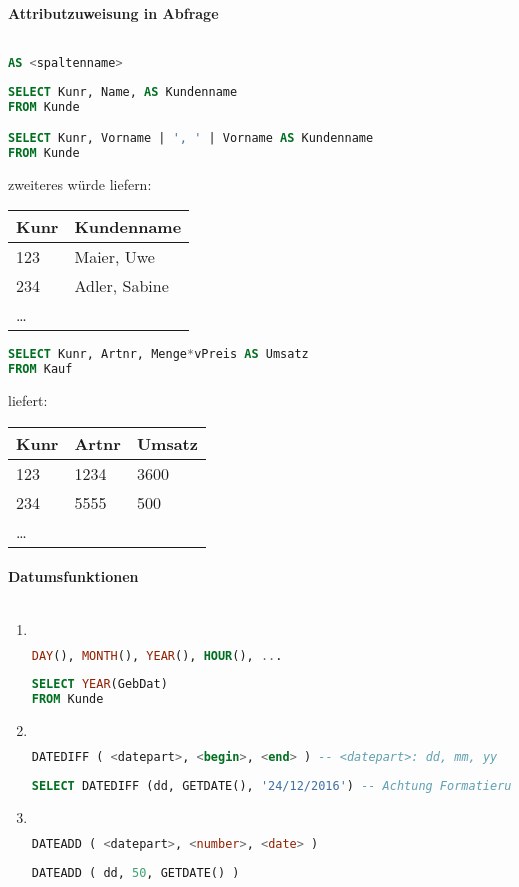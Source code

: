 \paragraph{Attributzuweisung in Abfrage}$ $
\begin{lstlisting}[language=SQL]
AS <spaltenname>
\end{lstlisting}
\begin{lstlisting}[language=SQL]
SELECT Kunr, Name, AS Kundenname
FROM Kunde 

SELECT Kunr, Vorname | ', ' | Vorname AS Kundenname
FROM Kunde
\end{lstlisting}
zweiteres würde liefern:\\
\begin{tabular}{l | l}
Kunr & Kundenname\\
\hline
123 & Maier, Uwe\\
234 & Adler, Sabine\\
…
\end{tabular}
\begin{lstlisting}[language=SQL]
SELECT Kunr, Artnr, Menge*vPreis AS Umsatz
FROM Kauf
\end{lstlisting}
liefert:\\
\begin{tabular}{l l | l}
Kunr & Artnr & Umsatz\\
\hline
123 & 1234 & 3600\\
234 & 5555 & 500\\
…
\end{tabular}
\paragraph{Datumsfunktionen}$ $
\begin{enumerate}
\item $ $ \begin{lstlisting}[language=SQL]
DAY(), MONTH(), YEAR(), HOUR(), ...
\end{lstlisting}
\begin{lstlisting}[language=SQL]
SELECT YEAR(GebDat)
FROM Kunde
\end{lstlisting}
\item $ $\begin{lstlisting}[language=SQL]
DATEDIFF ( <datepart>, <begin>, <end> ) -- <datepart>: dd, mm, yy
\end{lstlisting}
\begin{lstlisting}[language=SQL]
SELECT DATEDIFF (dd, GETDATE(), '24/12/2016') -- Achtung Formatierung des Datums ist von DBMS abhängig (ob / oder . und Reihenfolge)
\end{lstlisting}
\item $ $\begin{lstlisting}[language=SQL]
DATEADD ( <datepart>, <number>, <date> )
\end{lstlisting}
\begin{lstlisting}[language=SQL]
DATEADD ( dd, 50, GETDATE() )
\end{lstlisting}
\end{enumerate}


